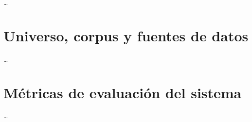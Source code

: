 \ldots

\section{Universo, corpus y fuentes de datos}
\label{sec:corpus}

\ldots

\section{Métricas de evaluación del sistema}
\label{sec:metricas}

\ldots

